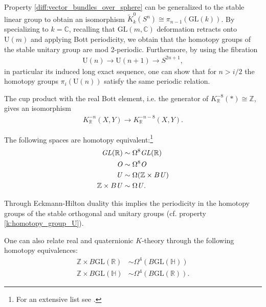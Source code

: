 {    \begin{property}\label{k:homotopy_group_U}
        Property \ref{diff:vector_bundles_over_sphere} can be generalized to the stable linear group to obtain an isomorphism $\widetilde{K}^0_k(S^n)\cong\pi_{n-1}(\text{GL}(k))$. By specializing to $k=\mathbb{C}$, recalling that $\text{GL}(m,\mathbb{C})$ deformation retracts onto $\text{U}(m)$ and applying Bott periodicity, we obtain that the homotopy groups of the stable unitary group are mod 2-periodic. Furthermore, by using the fibration
        \begin{gather}
            \text{U}(n)\rightarrow\text{U}(n+1)\rightarrow S^{2n+1},
        \end{gather}
        in particular its induced long exact sequence, one can show that for $n>i/2$ the homotopy groups $\pi_i(\text{U}(n))$ satisfy the same periodic relation.
    \end{property}

    \begin{theorem}
        The cup product with the real Bott element, i.e. the generator of $K^{-8}_{\mathbb{R}}(\ast)\cong\mathbb{Z}$, gives an isomorphism
        \begin{gather}
            K^{-n}_{\mathbb{R}}(X, Y)\rightarrow K^{-n-8}_{\mathbb{R}}(X, Y).
        \end{gather}
    \end{theorem}

    \begin{theorem}
        The following spaces are homotopy equivalent:\footnote{For an extensive list see \cite{karoubi}.}
        \begin{align}
            \text{\emph{GL}}(\mathbb{R})&\sim\Omega^8\text{\emph{GL}}(\mathbb{R})\\
            \text{\emph{O}}&\sim\Omega^8\text{\emph{O}}\nonumber\\
            \text{\emph{U}}&\sim\Omega(\mathbb{Z}\times B\text{\emph{U}})\\
            \mathbb{Z}\times B\text{\emph{U}}&\sim\Omega\text{\emph{U}}.
        \end{align}
    \end{theorem}
    \begin{result}
        Through Eckmann-Hilton duality this implies the periodicity in the homotopy groups of the stable orthogonal and unitary groups (cf. property \ref{k:homotopy_group_U}).
    \end{result}
    \begin{property}
        One can also relate real and quaternionic $K$-theory through the following homotopy equivalences:
        \begin{align}
            \mathbb{Z}\times B\text{GL}(\mathbb{R})&\sim\Omega^4(B\text{GL}(\mathbb{H}))\\
            \mathbb{Z}\times B\text{GL}(\mathbb{H})&\sim\Omega^4(B\text{GL}(\mathbb{R})).
        \end{align}
    \end{property}

}
